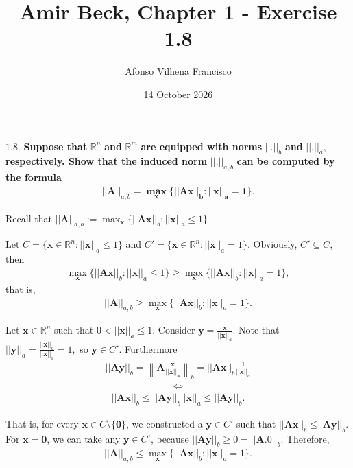 \documentclass{article}
\title{Amir Beck, Chapter 1 - Exercise 1.8}
\author{Afonso Vilhena Francisco}
\date{14 October 2026}
\begin{document}
\maketitle

$\mathbf{1.8.}$ \textbf{Suppose that} $\mathbb{R}^n$ \textbf{and} $\mathbb{R}^m$ \textbf{are equipped with norms} $\mathbf{||.||}_b$ \textbf{and} $\mathbf{||.||}_a,$ \textbf{respectively. Show that the induced norm} $\mathbf{||.||}_{a,b}$ \textbf{can be computed by the formula}
\begin{align*}
    \mathbf{||A||}_{a,b} \mathbf{= \max _x \{ ||Ax||_b:||x||_a=1 \}}.
\end{align*}

\vspace{0.3cm}

Recall that $||\mathbf{A}||_{a,b}:= \max _\mathbf{x} \{||\mathbf{Ax}||_b:||\mathbf{x}||_a \leq 1\}$

Let $C=\{ \mathbf{x} \in \mathbb{R}^n:||\mathbf{x}||_a \leq 1 \}$ and $C'=\{ \mathbf{x} \in \mathbb{R}^n:||\mathbf{x}||_a = 1 \}$. Obviously, $C' \subseteq C$, then 
\begin{align*}
    \max _\mathbf{x} \{||\mathbf{Ax}||_b:||\mathbf{x}||_a \leq 1\} \geq \max _\mathbf{x} \{ ||\mathbf{Ax}||_b:||\mathbf{x}||_a=1 \},
\end{align*}
that is,
\begin{align*}
    ||\mathbf{A}||_{a,b} \geq \max _\mathbf{x} \{ ||\mathbf{Ax}||_b:||\mathbf{x}||_a=1 \}.
\end{align*}

Let $\mathbf{x} \in \mathbb{R}^n$ such that $0< ||\mathbf{x}||_a\leq 1$. Consider $\mathbf{y} = \frac{\mathbf{x}}{||\mathbf{x}||_a}$. Note that $||\mathbf{y}||_a=\frac{||\mathbf{x}||_a}{||\mathbf{x}||_a}=1,$ so $\mathbf{y} \in C'$. Furthermore
\begin{align*}
    ||\mathbf{Ay}||_b=\left\| \mathbf{A \frac{x}{||x||_a}} \right\|_b=||\mathbf{Ax}||_b\frac{1}{||\mathbf{x}||_a}
\end{align*}
\begin{align*}
    \Leftrightarrow
\end{align*}
\begin{align*}
    ||\mathbf{Ax}||_b \leq ||\mathbf{Ay}||_b ||\mathbf{x}||_a \leq ||\mathbf{Ay}||_b.
\end{align*}

That is, for every $\mathbf{x} \in C\setminus \{ \mathbf{0}\}$, we constructed a $\mathbf{y} \in C'$ such that $||\mathbf{Ax}||_b \leq|\mathbf{Ay}||_b$. For $\mathbf{x=0}$, we can take any $\mathbf{y} \in C'$, because $||\mathbf{Ay||}_b \geq 0=||\mathbf{A.0||}_b$. Therefore,
\begin{align*}
    ||\mathbf{A}||_{a,b} \leq \max _\mathbf{x} \{ ||\mathbf{Ax}||_b:||\mathbf{x}||_a=1 \}.
\end{align*}
\end{document}
